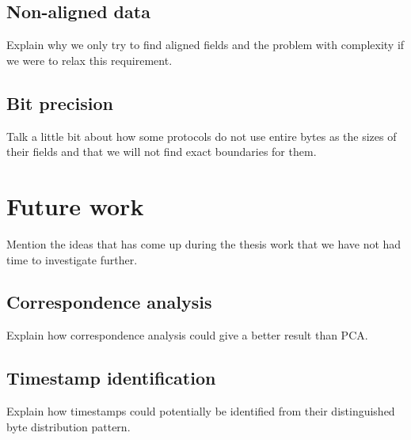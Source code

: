 \documentclass[a4paper]{report}
\begin{document}
\subsection{Non-aligned data}
Explain why we only try to find aligned fields and the problem with complexity
if we were to relax this requirement.

\subsection{Bit precision}
Talk a little bit about how some protocols do not use entire bytes as the sizes
of their fields and that we will not find exact boundaries for them.

\section{Future work}
Mention the ideas that has come up during the thesis work that we have not had
time to investigate further.

\subsection{Correspondence analysis}
Explain how correspondence analysis could give a better result than PCA.

\subsection{Timestamp identification}
Explain how timestamps could potentially be identified from their distinguished
byte distribution pattern.



\end{document}
